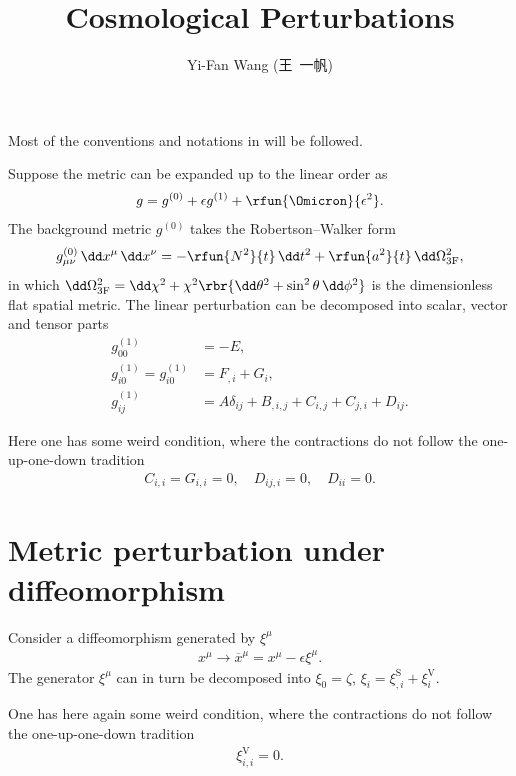 \documentclass[a4paper,11pt]{article}
\title{Cosmological Perturbations}
\author{Yi-Fan Wang (王\ 一帆)}
\begin{document}
\maketitle

Most of the conventions and notations in \cite[ch.~5]{Weinberg2008} will be 
followed.

Suppose the metric can be expanded up to the linear order as
\begin{align}
g = g^{(0)} + \epsilon g^{(1)} + \rfun{\Omicron}{\epsilon^2}.
\end{align}
The background metric $g^{(0)}$ takes the Robertson--Walker form
\begin{align}
g^{(0)}_{\mu\nu}\,\dd x^\mu\,\dd x^\nu =
-\rfun{N^2}{t}\,\dd t^2 + \rfun{a^2}{t}\,\dd \Omega_\text{3F}^2,
\end{align}
in which $\dd\Omega_\text{3F}^2 =
\dd\chi^2 + \chi^2\rbr{\dd\theta^2 + \sin^2\theta\,\dd \phi^2}$ is the 
dimensionless flat spatial metric.
The linear perturbation can be decomposed into scalar, vector and tensor parts
\begin{align}
g^{(1)}_{00} &= -E, \\
g^{(1)}_{i0} = g^{(1)}_{i0} &= F_{,i}+G_i, \\
g^{(1)}_{ij} &= A \delta_{ij} + B_{,i,j}+C_{i,j}+C_{j,i}+D_{ij}.
\end{align}

Here one has some weird condition, where the contractions do not follow the 
one-up-one-down tradition
\begin{align}
C_{i,i} = G_{i,i} = 0,
\quad
D_{ij,i} = 0,
\quad
D_{ii} = 0.
\end{align}

\section{Metric perturbation under diffeomorphism}


Consider a diffeomorphism generated by $\xi^\mu$
\begin{align}
x^\mu \to \overline{x}^\mu = x^\mu - \epsilon \xi^\mu.
\end{align}
The generator $\xi^\mu$ can in turn be decomposed into $\xi_0 = \zeta$, $\xi_i 
= \xi^\text{S}_{,i} + \xi^\text{V}_{i}$.

One has here again some weird condition, where the contractions do not follow 
the one-up-one-down tradition
\begin{align}
\xi^\text{V}_{i,i} = 0.
\end{align}
\end{document}
